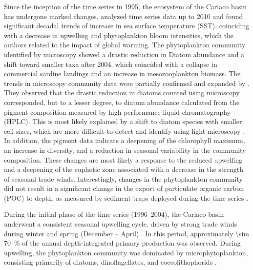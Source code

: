 \documentclass[draft]{agujournal2019}
\begin{document}
    Since the inception of the time series in 1995, the ecosystem of the Cariaco basin has undergone marked changes.  analyzed time series data up to 2010 and found significant decadal trends of increase in sea surface temperature (SST), coinciding with a decrease in upwelling and phytoplankton bloom intensities, which the authors related to the impact of global warming. The phytoplankton community identified by microscopy showed a drastic reduction in Diatom abundance and a shift toward smaller taxa after 2004, which coincided with a collapse in commercial sardine landings and an increase in mesozooplankton biomass.
    The trends in microscopy community data were partially confirmed and expanded by . They observed that the drastic reduction in diatoms counted using microscopy corresponded, but to a lesser degree, to diatom abundance calculated from the pigment composition measured by high-performance liquid chromatography (HPLC). This is most likely explained by a shift to diatom species with smaller cell sizes, which are more difficult to detect and identify using light microscopy \cite{lorenzoni_characterization_2015}. In addition, the pigment data indicate a deepening of the chlorophyll maximum, an increase in diversity, and a reduction in seasonal variability in the community composition. These changes are most likely a response to the reduced upwelling and a deepening of the euphotic zone associated with a decrease in the strength of seasonal trade winds. Interestingly, changes in the phytoplankton community did not result in a significant change in the export of particulate organic carbon (POC) to depth, as measured by sediment traps deployed during the time series \cite{pinckney_phytoplankton_2015}.


    During the initial phase of the time series (1996–2004), the Cariaco basin underwent a consistent seasonal upwelling cycle, driven by strong trade winds during winter and spring (December – April) \cite{mullerkarger_annual_2001, astor_seasonal_2003}. In this period, approximately \qty{\sim 70}{\%} of the annual depth-integrated primary production was observed. During upwelling, the phytoplankton community was dominated by microphytoplankton, consisting primarily of diatoms, dinoflagellates, and coccolithophorids \cite{pinckney_phytoplankton_2015}.
\end{document}
